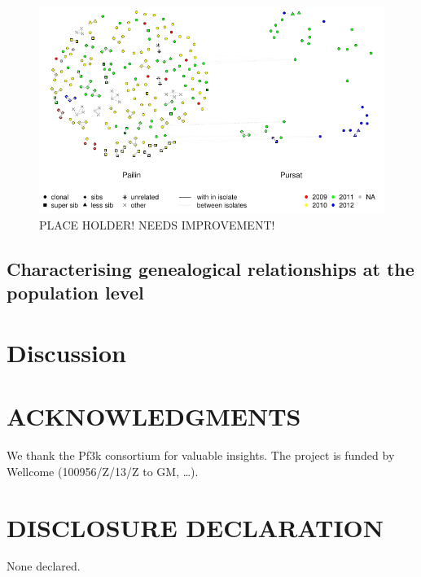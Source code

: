 \documentclass[9pt,lineno]{elife}
\begin{document}
\begin{figure}[ht]
  \centering{}
  \includegraphics[width=\textwidth]{Fig6.pdf}
  \caption{PLACE HOLDER! NEEDS IMPROVEMENT!}
\end{figure}





\subsection{Characterising genealogical relationships at the population level}







\section{Discussion}




\section{ACKNOWLEDGMENTS}
We thank the Pf3k consortium for valuable insights. The project is funded by  Wellcome (100956/Z/13/Z to GM, \ldots).




\section{DISCLOSURE DECLARATION}
None declared.






\end{document}
